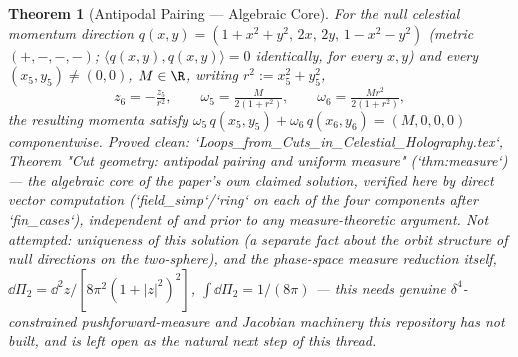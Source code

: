 \documentclass{report}
\newtheorem{theorem}{Theorem}[chapter]
\theoremstyle{definition}
\begin{document}
\begin{theorem}[Antipodal Pairing --- Algebraic Core]
  \label{thm:antipodal-pairing-core}
  \leanok
  For the null celestial momentum direction $q(x,y) = (1{+}x^2{+}y^2,\,2x,\,2y,\,1{-}x^2{-}y^2)$
  (metric $(+,-,-,-)$; $\langle q(x,y),q(x,y)\rangle=0$ identically, for every $x,y$) and
  every $(x_5,y_5)\ne(0,0)$, $M\in\R$, writing $r^2:=x_5^2+y_5^2$,
  \[
    z_6 = -\tfrac{z_5}{r^2},\qquad
    \omega_5 = \tfrac{M}{2(1+r^2)},\qquad
    \omega_6 = \tfrac{M r^2}{2(1+r^2)},
  \]
  the resulting momenta satisfy $\omega_5\,q(x_5,y_5) + \omega_6\,q(x_6,y_6) = (M,0,0,0)$
  componentwise.
  \emph{Proved clean}: `Loops\_from\_Cuts\_in\_Celestial\_Holography.tex`, Theorem
  "Cut geometry: antipodal pairing and uniform measure" (`thm:measure`) --- the algebraic
  core of the paper's own claimed solution, verified here by direct vector computation
  (`field_simp`/`ring` on each of the four components after `fin_cases`), independent of and
  prior to any measure-theoretic argument.
  \emph{Not attempted}: uniqueness of this solution (a separate fact about the orbit
  structure of null directions on the two-sphere), and the phase-space \emph{measure}
  reduction itself,
  $\dd\Pi_2 = \dd^2z/[8\pi^2(1{+}|z|^2)^2]$, $\int\dd\Pi_2=1/(8\pi)$ --- this needs genuine
  $\delta^4$-constrained pushforward-measure and Jacobian machinery this repository has not
  built, and is left open as the natural next step of this thread.
\end{theorem}
\end{document}
